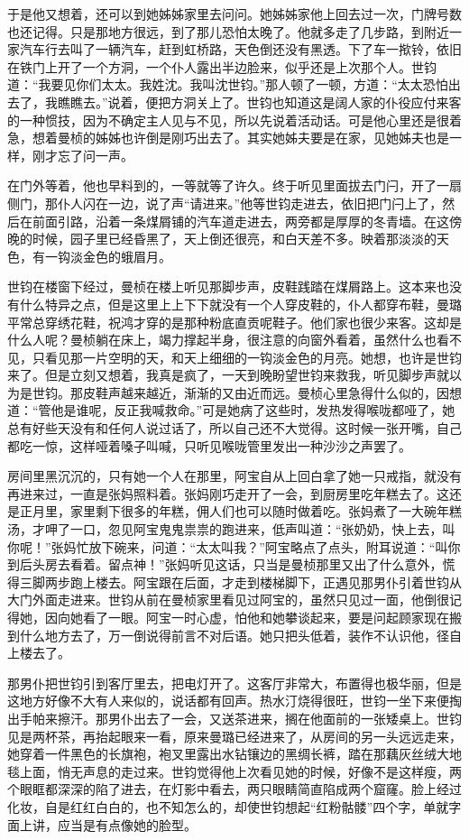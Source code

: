 \par 于是他又想着，还可以到她姊姊家里去问问。她姊姊家他上回去过一次，门牌号数也还记得。只是那地方很远，到了那儿恐怕太晚了。他就多走了几步路，到附近一家汽车行去叫了一辆汽车，赶到虹桥路，天色倒还没有黑透。下了车一揿铃，依旧在铁门上开了一个方洞，一个仆人露出半边脸来，似乎还是上次那个人。世钧道：“我要见你们太太。我姓沈。我叫沈世钧。”那人顿了一顿，方道：“太太恐怕出去了，我瞧瞧去。”说着，便把方洞关上了。世钧也知道这是阔人家的仆役应付来客的一种惯技，因为不确定主人见与不见，所以先说着活动话。可是他心里还是很着急，想着曼桢的姊姊也许倒是刚巧出去了。其实她姊夫要是在家，见她姊夫也是一样，刚才忘了问一声。
\par 在门外等着，他也早料到的，一等就等了许久。终于听见里面拔去门闩，开了一扇侧门，那仆人闪在一边，说了声“请进来。”他等世钧走进去，依旧把门闩上了，然后在前面引路，沿着一条煤屑铺的汽车道走进去，两旁都是厚厚的冬青墙。在这傍晚的时候，园子里已经昏黑了，天上倒还很亮，和白天差不多。映着那淡淡的天色，有一钩淡金色的蛾眉月。
\par 世钧在楼窗下经过，曼桢在楼上听见那脚步声，皮鞋践踏在煤屑路上。这本来也没有什么特异之点，但是这里上上下下就没有一个人穿皮鞋的，仆人都穿布鞋，曼璐平常总穿绣花鞋，祝鸿才穿的是那种粉底直贡呢鞋子。他们家也很少来客。这却是什么人呢？曼桢躺在床上，竭力撑起半身，很注意的向窗外看着，虽然什么也看不见，只看见那一片空明的天，和天上细细的一钩淡金色的月亮。她想，也许是世钧来了。但是立刻又想着，我真是疯了，一天到晚盼望世钧来救我，听见脚步声就以为是世钧。那皮鞋声越来越近，渐渐的又由近而远。曼桢心里急得什么似的，因想道：“管他是谁呢，反正我喊救命。”可是她病了这些时，发热发得喉咙都哑了，她总有好些天没有和任何人说过话了，所以自己还不大觉得。这时候一张开嘴，自己都吃一惊，这样哑着嗓子叫喊，只听见喉咙管里发出一种沙沙之声罢了。
\par 房间里黑沉沉的，只有她一个人在那里，阿宝自从上回白拿了她一只戒指，就没有再进来过，一直是张妈照料着。张妈刚巧走开了一会，到厨房里吃年糕去了。这还是正月里，家里剩下很多的年糕，佣人们也可以随时做着吃。张妈煮了一大碗年糕汤，才呷了一口，忽见阿宝鬼鬼祟祟的跑进来，低声叫道：“张奶奶，快上去，叫你呢！”张妈忙放下碗来，问道：“太太叫我？”阿宝略点了点头，附耳说道：“叫你到后头房去看着。留点神！”张妈听见这话，只当是曼桢那里又出了什么意外，慌得三脚两步跑上楼去。阿宝跟在后面，才走到楼梯脚下，正遇见那男仆引着世钧从大门外面走进来。世钧从前在曼桢家里看见过阿宝的，虽然只见过一面，他倒很记得她，因向她看了一眼。阿宝一时心虚，怕他和她攀谈起来，要是问起顾家现在搬到什么地方去了，万一倒说得前言不对后语。她只把头低着，装作不认识他，径自上楼去了。
\par 那男仆把世钧引到客厅里去，把电灯开了。这客厅非常大，布置得也极华丽，但是这地方好像不大有人来似的，说话都有回声。热水汀烧得很旺，世钧一坐下来便掏出手帕来擦汗。那男仆出去了一会，又送茶进来，搁在他面前的一张矮桌上。世钧见是两杯茶，再抬起眼来一看，原来曼璐已经进来了，从房间的另一头远远走来，她穿着一件黑色的长旗袍，袍叉里露出水钻镶边的黑绸长裤，踏在那藕灰丝绒大地毯上面，悄无声息的走过来。世钧觉得他上次看见她的时候，好像不是这样瘦，两个眼眶都深深的陷了进去，在灯影中看去，两只眼睛简直陷成两个窟窿。脸上经过化妆，自是红红白白的，也不知怎么的，却使世钧想起“红粉骷髅”四个字，单就字面上讲，应当是有点像她的脸型。
